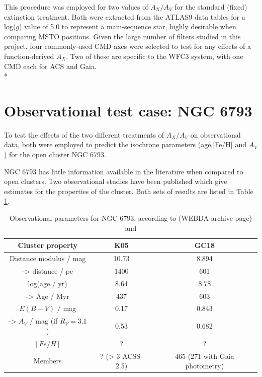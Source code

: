 \documentclass[12pt, a4paper]{report}
\begin{document}
This procedure was employed for two values of $A_{X}/A_{V}$ for the standard (fixed) extinction treatment. Both were extracted from the ATLAS9 data tables for a log($g$) value of 5.0 to represent a main-sequence star, highly desirable when comparing MSTO positions. Given the large number of filters studied in this project, four commonly-used CMD axes were selected to test for any effects of a function-derived $A_{X}$. Two of these are specific to the WFC3 system, with one CMD each for ACS and Gaia.\\*

\section{Observational test case: NGC 6793}
To test the effects of the two different treatments of $A_{X}/A_{V}$ on observational data, both were employed to predict the isochrone parameters (age,[Fe/H] and $A_{V}$) for the open cluster NGC 6793.

NGC 6793 has little information available in the literature when compared to open clusters. Two observational studies have been published which give estimates for the properties of the cluster. Both sets of results are listed in Table \ref{NGC6793_obs}.

\begin{table}
\begin{center}
\begin{tabular}{ccc}
\hline
Cluster property & K05 & GC18 \\
\hline
Distance modulus / mag & 10.73 & 8.894 \\
-> distance / pc & 1400 & 601 \\
log(age / yr) & 8.64 & 8.78 \\
-> Age / Myr & 437 & 603 \\
$E(B-V)$ / mag & 0.17 & 0.843 \\
-> $A_{V}$ / mag (if $R_{V} = 3.1$) & 0.53 & 0.682 \\
$[Fe/H]$ & ? & ? \\
Members & ? (> 3 ACSS-2.5) & 465 (271 with Gaia photometry) \\
\hline
\end{tabular}
\caption{Observational parameters for NGC 6793, according to \cite{2005A&A...438.1163K} (WEBDA archive page) and \cite{2018A&A...616A..10G}}
\label{NGC6793_obs}
\end{center}
\end{table}
\end{document}
